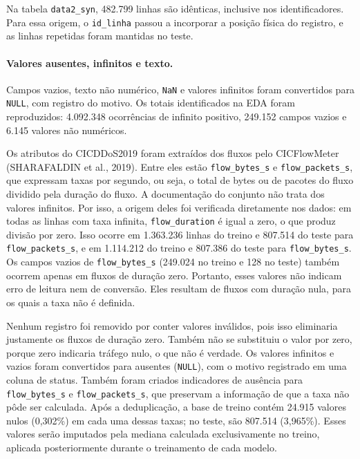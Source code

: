 \documentclass[
    12pt,                %
    openright,           %
    oneside,             %
    a4paper,             %
    english,             %
    brazil               %
]{abntex2}
\begin{document}
Na tabela \texttt{data2\_syn}, 482.799 linhas são idênticas, inclusive nos identificadores. Para essa origem, o \texttt{id\_linha} passou a incorporar a posição física do registro, e as linhas repetidas foram mantidas no teste.

\paragraph{Valores ausentes, infinitos e texto.}
Campos vazios, texto não numérico, \texttt{NaN} e valores infinitos foram convertidos para \texttt{NULL}, com registro do motivo. Os totais identificados na EDA foram reproduzidos: 4.092.348 ocorrências de infinito positivo, 249.152 campos vazios e 6.145 valores não numéricos.

Os atributos do CICDDoS2019 foram extraídos dos fluxos pelo CICFlowMeter (SHARAFALDIN et al., 2019). Entre eles estão \texttt{flow\_bytes\_s} e \texttt{flow\_packets\_s}, que expressam taxas por segundo, ou seja, o total de bytes ou de pacotes do fluxo dividido pela duração do fluxo. A documentação do conjunto não trata dos valores infinitos. Por isso, a origem deles foi verificada diretamente nos dados: em todas as linhas com taxa infinita, \texttt{flow\_duration} é igual a zero, o que produz divisão por zero. Isso ocorre em 1.363.236 linhas do treino e 807.514 do teste para \texttt{flow\_packets\_s}, e em 1.114.212 do treino e 807.386 do teste para \texttt{flow\_bytes\_s}. Os campos vazios de \texttt{flow\_bytes\_s} (249.024 no treino e 128 no teste) também ocorrem apenas em fluxos de duração zero. Portanto, esses valores não indicam erro de leitura nem de conversão. Eles resultam de fluxos com duração nula, para os quais a taxa não é definida.

Nenhum registro foi removido por conter valores inválidos, pois isso eliminaria justamente os fluxos de duração zero. Também não se substituiu o valor por zero, porque zero indicaria tráfego nulo, o que não é verdade. Os valores infinitos e vazios foram convertidos para ausentes (\texttt{NULL}), com o motivo registrado em uma coluna de status. Também foram criados indicadores de ausência para \texttt{flow\_bytes\_s} e \texttt{flow\_packets\_s}, que preservam a informação de que a taxa não pôde ser calculada. Após a deduplicação, a base de treino contém 24.915 valores nulos (0,302\%) em cada uma dessas taxas; no teste, são 807.514 (3,965\%). Esses valores serão imputados pela mediana calculada exclusivamente no treino, aplicada posteriormente durante o treinamento de cada modelo.
\end{document}
